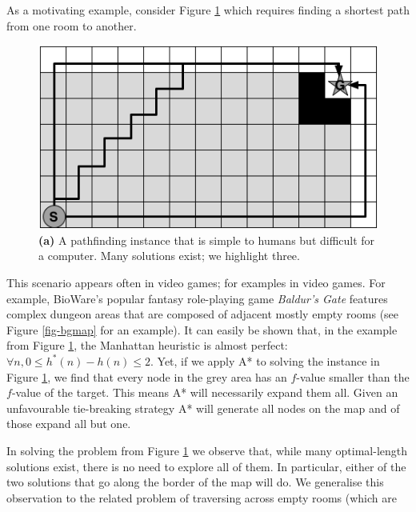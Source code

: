 As a motivating example, consider Figure \ref{fig-emptymap} which requires
finding a shortest path from one room to another.
\begin{figure}[htbp]
       \begin{center}
                       \includegraphics[scale=0.50, trim = 10mm 10mm 10mm 0mm]{diagrams/emptymap.png}
       \end{center}
	\vspace{-3pt}
       \caption{\textbf{(a)} A pathfinding instance that is simple to humans but difficult for a computer. 
				Many solutions exist; we highlight three. }
       \label{fig-emptymap}
\end{figure}
This scenario appears often in video games; for examples 
in video games.
For example, BioWare's popular fantasy role-playing game \emph{Baldur's Gate} features complex dungeon
 areas that are composed of adjacent mostly empty rooms (see Figure \ref{fig-bgmap} for an example).
It can easily be shown that, in the example from Figure \ref{fig-emptymap}, the Manhattan heuristic is almost perfect: $\forall n, 0 \leq h^*(n) - h(n) \leq 2$.
Yet, if we apply A* to solving the instance in Figure \ref{fig-emptymap}, 
we find that every node in the grey area has an $f$-value smaller than the $f$-value of the target.
This means A* will necessarily expand them all. 
Given an unfavourable tie-breaking strategy A* will generate all nodes on the map and of those expand 
all but one.
\par
In solving the problem from Figure \ref{fig-emptymap} we observe that,
while many optimal-length solutions exist, there is no need to explore all of them.
In particular, either of the two solutions that go along the border of the map will do.
We generalise this observation to the related problem of traversing across empty rooms (which are 
